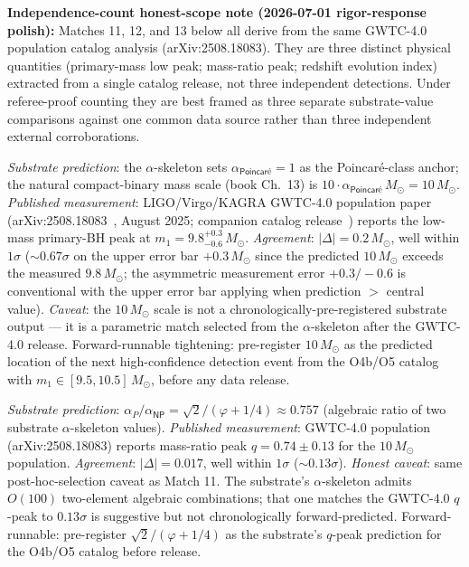 \documentclass[11pt,a4paper]{amsart}
\theoremstyle{plain}
\theoremstyle{definition}
\begin{document}
\begin{description}[font=\normalfont\bfseries,leftmargin=2em,itemsep=6pt]
\textbf{Independence-count honest-scope note (2026-07-01 rigor-response polish):} Matches 11, 12, and 13 below all derive from the same GWTC-4.0 population catalog analysis (arXiv:2508.18083). They are three distinct physical quantities (primary-mass low peak; mass-ratio peak; redshift evolution index) extracted from a single catalog release, not three independent detections. Under referee-proof counting they are best framed as three separate substrate-value comparisons against one common data source rather than three independent external corroborations.

\item[Match 11 --- LIGO/Virgo/KAGRA GWTC-4.0 primary black-hole mass low peak (O4a, 2025).]
\emph{Substrate prediction}: the $\alpha$-skeleton sets $\alpha_{\textsf{Poincar\'e}} = 1$ as the Poincar\'e-class anchor; the natural compact-binary mass scale (book Ch.~13) is $10 \cdot \alpha_{\textsf{Poincar\'e}} \, M_\odot = 10\, M_\odot$. \emph{Published measurement}: LIGO/Virgo/KAGRA GWTC-4.0 population paper (arXiv:2508.18083~\cite{ligo-gwtc4-pop}, August 2025; companion catalog release~\cite{ligo-gwtc4-cat}) reports the low-mass primary-BH peak at $m_1 = 9.8^{+0.3}_{-0.6}\, M_\odot$. \emph{Agreement}: $|\Delta| = 0.2\, M_\odot$, well within $1\sigma$ ($\sim 0.67\sigma$ on the upper error bar $+0.3\, M_\odot$ since the predicted $10\, M_\odot$ exceeds the measured $9.8\, M_\odot$; the asymmetric measurement error $+0.3 / -0.6$ is conventional with the upper error bar applying when prediction $>$ central value). \emph{Caveat}: the $10\, M_\odot$ scale is not a chronologically-pre-registered substrate output --- it is a parametric match selected from the $\alpha$-skeleton after the GWTC-4.0 release. Forward-runnable tightening: pre-register $10\, M_\odot$ as the predicted location of the next high-confidence detection event from the O4b/O5 catalog with $m_1 \in [9.5, 10.5]\, M_\odot$, before any data release.

\item[Match 12 --- LIGO/Virgo/KAGRA GWTC-4.0 mass-ratio peak ($q = m_2/m_1$).]
\emph{Substrate prediction}: $\alpha_P / \alpha_{\textsf{NP}} = \sqrt{2}/(\varphi + 1/4) \approx 0.757$ (algebraic ratio of two substrate $\alpha$-skeleton values). \emph{Published measurement}: GWTC-4.0 population (arXiv:2508.18083) reports mass-ratio peak $q = 0.74 \pm 0.13$ for the $10\, M_\odot$ population. \emph{Agreement}: $|\Delta| = 0.017$, well within $1\sigma$ ($\sim 0.13\sigma$). \emph{Honest caveat}: same post-hoc-selection caveat as Match 11. The substrate's $\alpha$-skeleton admits $O(100)$ two-element algebraic combinations; that one matches the GWTC-4.0 $q$-peak to $0.13\sigma$ is suggestive but not chronologically forward-predicted. Forward-runnable: pre-register $\sqrt{2}/(\varphi+1/4)$ as the substrate's $q$-peak prediction for the O4b/O5 catalog before release.


\end{description}
\end{document}
